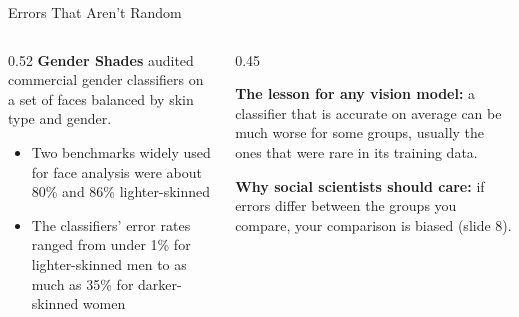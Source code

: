 \newcommand{\coursemodule}{Module 07}





\begin{frame}{Errors That Aren't Random}
\begin{columns}[T]
\begin{column}{0.52\textwidth}
\textbf{Gender Shades}  audited commercial gender
classifiers on a set of faces balanced by skin type and gender.

\begin{itemize}
\item Two benchmarks widely used for face analysis were about 80\% and 86\% lighter-skinned
\item The classifiers' error rates ranged from under 1\% for lighter-skinned men to as much as
      35\% for darker-skinned women
\end{itemize}
\end{column}
\begin{column}{0.45\textwidth}
\begin{warnbox}
\textbf{The lesson for any vision model:} a classifier that is accurate on average can be much
worse for some groups, usually the ones that were rare in its training data.
\end{warnbox}
\begin{graybox}
\textbf{Why social scientists should care:} if errors differ between the groups you compare, your
comparison is biased (slide 8).
\end{graybox}
\end{column}
\end{columns}
\end{frame}

